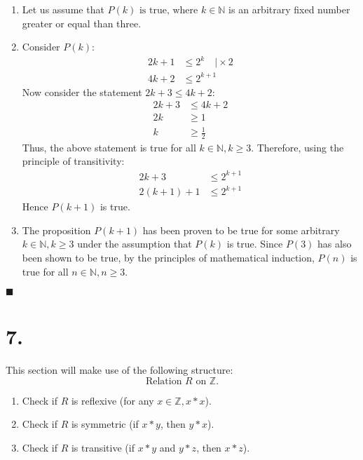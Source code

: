 \documentclass[12pt]{article}
\newcommand{\q}{\hfill $\blacksquare$}
\newenvironment{ps}
{\begin{enumerate}[leftmargin=0em, itemindent=1.5em]}
{\end{enumerate}}
\begin{document}
\begin{ps}
\begin{enumerate}[label=\arabic*.]
    \item Let us assume that \( P(k) \text{ is true, where } k \in \mathbb{N} \) is an arbitrary
        fixed number greater or equal than three.

    \item Consider \( P(k) \):
    \begin{align*}
        2k + 1 &\leq 2^k \quad \biggr| \times 2 \\
        4k + 2 &\leq 2^{k+1}
    \end{align*}
    Now consider the statement \( 2k+3 \leq 4k + 2 \):
    \begin{align*}
        2k + 3 &\leq 4k + 2 \\
        2k &\geq 1 \\
        k &\geq \frac{1}{2}
    \end{align*}
    Thus, the above statement is true for all \( k \in \mathbb{N}, k \geq 3 \).
    Therefore, using the principle of transitivity:
    \begin{align*}
        2k+3 &\leq 2^{k+1} \\
        2(k+1) + 1 &\leq 2^{k+1}
    \end{align*}
    Hence \( P(k+1) \) is true.

    \item The proposition \( P(k+1) \) has been proven to be true for some arbitrary \( k \in
        \mathbb{N}, k \geq 3\) under the assumption that \( P(k) \) is true. Since \( P(3) \) has also been
        shown to be true, by the principles of mathematical induction, \( P(n) \) is true for all \( n \in
        \mathbb{N}, n \geq 3 \).

    \end{enumerate} \q

\end{ps}

\section*{7.}
This section will make use of the following structure:
\[
    \text{Relation } R \text{ on } \mathbb{Z}.
\]   
\begin{enumerate}

    \item Check if \( R \) is reflexive (for any \(x \in \mathbb{Z}, x*x \)).
    \item Check if \( R \) is symmetric (if \( x*y \), then \( y*x \)).
    \item Check if \( R \) is transitive (if \( x*y \) and \( y*z \), then \( x*z \)).

\end{enumerate}
\end{document}
